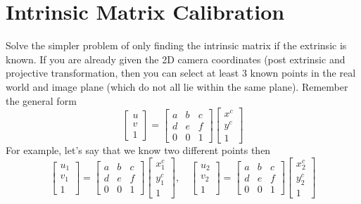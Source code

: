 \section{Intrinsic Matrix Calibration} 
Solve the simpler problem of only finding the intrinsic matrix if the extrinsic is known.  
If you are already given the 2D camera coordinates (post extrinsic and projective transformation, then you can select at least 3 known points in the real world and image plane (which do not all lie within the same plane). Remember the general form
$$\left[\begin{array}{c} u \\v \\ 1 \end{array}\right] =\left[\begin{array}{ccc} a & b & c \\d & e & f \\ 0 & 0 & 1 \end{array}\right]\left[\begin{array}{c} x^c \\y^c \\ 1 \end{array}\right]$$
For example, let's say that we know two different points then
$$\left[\begin{array}{c} u_1 \\v_1 \\ 1 \end{array}\right] =\left[\begin{array}{ccc} a & b & c \\d & e & f \\ 0 & 0 & 1 \end{array}\right]\left[\begin{array}{c} x^c_1 \\y^c_1 \\ 1 \end{array}\right], \quad \left[\begin{array}{c} u_2 \\v_2 \\ 1 \end{array}\right] =\left[\begin{array}{ccc} a & b & c \\d & e & f \\ 0 & 0 & 1 \end{array}\right]\left[\begin{array}{c} x^c_2 \\y^c_2 \\ 1 \end{array}\right]$$
